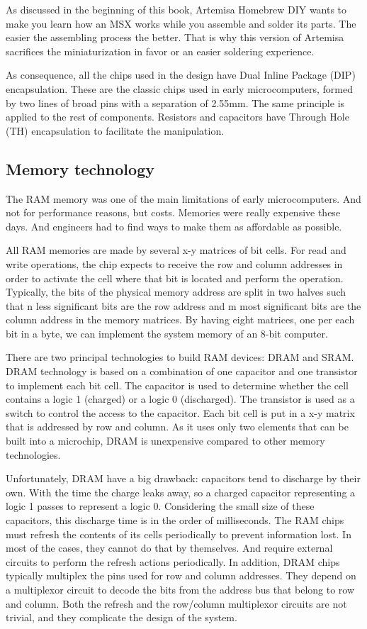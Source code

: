 As discussed in the beginning of this book, Artemisa Homebrew DIY wants to make you learn how an MSX works while you assemble and solder its parts. The easier the assembling process the better. That is why this version of Artemisa sacrifices the miniaturization in favor or an easier soldering experience.

As consequence, all the chips used in the design have Dual Inline Package (DIP) encapsulation.  These are the classic chips used in early microcomputers, formed by two lines of broad pins with a separation of 2.55mm. The same principle is applied to the rest of components. Resistors and capacitors have Through Hole (TH) encapsulation to facilitate the manipulation.

\subsection{Memory technology}

The RAM memory was one of the main limitations of early microcomputers. And not for performance reasons, but costs. Memories were really expensive these days. And engineers had to find ways to make them as affordable as possible.

All RAM memories are made by several x-y matrices of bit cells. For read and write operations, the chip expects to receive the row and column addresses in order to activate the cell where that bit is located and perform the operation. Typically, the bits of the physical memory address are split in two halves such that n less significant bits are the row address and m most significant bits are the column address in the memory matrices. By having eight matrices, one per each bit in a byte, we can implement the system memory of an 8-bit computer.

There are two principal technologies to build RAM devices: DRAM and SRAM. DRAM technology is based on a combination of one capacitor and one transistor to implement each bit cell. The capacitor is used to determine whether the cell contains a logic 1 (charged) or a logic 0 (discharged). The transistor is used as a switch to control the access to the capacitor. Each bit cell is put in a x-y matrix that is addressed by row and column. As it uses only two elements that can be built into a microchip, DRAM is unexpensive compared to other memory technologies.

Unfortunately, DRAM have a big drawback: capacitors tend to discharge by their own. With the time the charge leaks away, so a charged capacitor representing a logic 1 passes to represent a logic 0. Considering the small size of these capacitors, this discharge time is in the order of milliseconds. The RAM chips must refresh the contents of its cells periodically to prevent information lost. In most of the cases, they cannot do that by themselves. And require external circuits to perform the refresh actions periodically. In addition, DRAM chips typically multiplex the pins used for row and column addresses. They depend on a multiplexor circuit to decode the bits from the address bus that belong to row and column. Both the refresh and the row/column multiplexor circuits are not trivial, and they complicate the design of the system.


